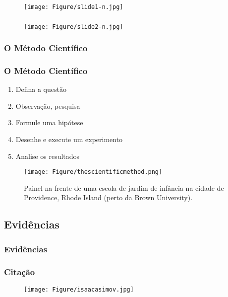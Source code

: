\documentclass[pdf,9pt,xcolor=dvipsnames,hide notes]{beamer}\usepackage[]{graphicx}\usepackage[]{color}
\begin{document}
\begin{frame}\frametitle{} 
  \begin{figure}[hb]
    \texttt{[image: Figure/slide1-n.jpg]}
  \end{figure}
\end{frame}

\begin{frame}\frametitle{} 
  \begin{figure}[hb]
    \texttt{[image: Figure/slide2-n.jpg]}
  \end{figure}
\end{frame}

\subsubsection{O Método Científico}

\begin{frame}\frametitle{O Método Científico} 
\begin{multicols}{2}
  \begin{enumerate}
    \item Defina a questão
    \item Observação, pesquisa
    \item Formule uma hipótese
    \item Desenhe e execute um experimento
    \item Analise os resultados
  \end{enumerate}

\begin{figure}[htbp]
    \texttt{[image: Figure/thescientificmethod.png]}
    \caption{\scriptsize Painel na frente de uma escola de jardim de infância na cidade de Providence, Rhode Island (perto da Brown University).}
\end{figure}
  
\end{multicols}
\end{frame}

\subsection{Evidências}
\subsubsection{Evidências}
\begin{frame}\frametitle{Citação} 
  \begin{figure}[hb]
    \texttt{[image: Figure/isaacasimov.jpg]}
  \end{figure}
\end{frame}
\end{document}

